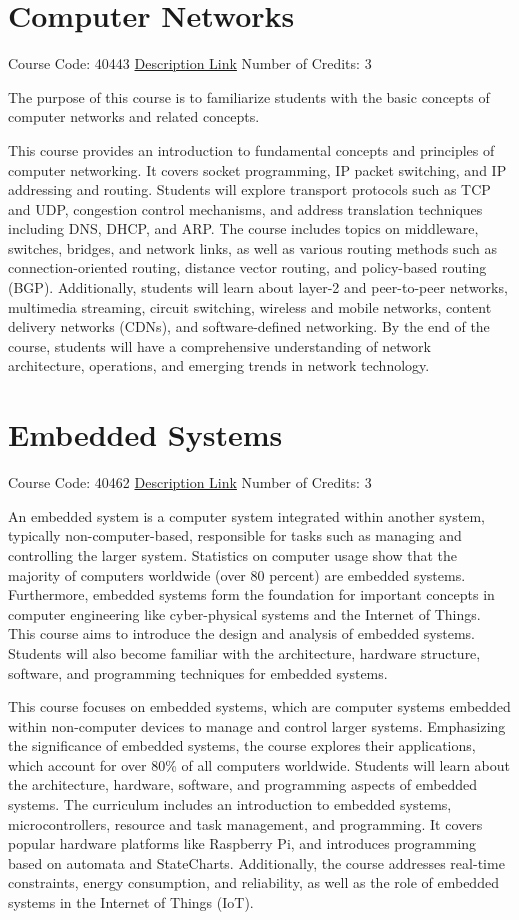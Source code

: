 \documentclass[
fontsize=11pt,
paper=a4,
parskip=half,
enlargefirstpage=off,    %
fromalign=right,        %
fromphone=on,           %
fromemail=on,
fromrule=off,           %
addrfield=off,          %
backaddress=on,         %
subject=beforeopening,  %
locfield=narrow,        %
foldmarks=off,          %
open=any
]{scrartcl}
\begin{document}
\section{Computer Networks}
Course Code: 40443 \qquad \quad \href{https://docs.ce.sharif.edu/course/40443}{Description Link}
\qquad \quad Number of Credits: 3

The purpose of this course is to familiarize students with the basic concepts of computer networks and related concepts.


This course provides an introduction to fundamental concepts and principles of computer networking. It covers socket programming, IP packet switching, and IP addressing and routing. Students will explore transport protocols such as TCP and UDP, congestion control mechanisms, and address translation techniques including DNS, DHCP, and ARP. The course includes topics on middleware, switches, bridges, and network links, as well as various routing methods such as connection-oriented routing, distance vector routing, and policy-based routing (BGP). Additionally, students will learn about layer-2 and peer-to-peer networks, multimedia streaming, circuit switching, wireless and mobile networks, content delivery networks (CDNs), and software-defined networking. By the end of the course, students will have a comprehensive understanding of network architecture, operations, and emerging trends in network technology.

\section{Embedded Systems}
Course Code: 40462 \qquad \quad \href{https://docs.ce.sharif.edu/course/40462}{Description Link}
\qquad \quad Number of Credits: 3

An embedded system is a computer system integrated within another system, typically non-computer-based, responsible for tasks such as managing and controlling the larger system. Statistics on computer usage show that the majority of computers worldwide (over 80 percent) are embedded systems. Furthermore, embedded systems form the foundation for important concepts in computer engineering like cyber-physical systems and the Internet of Things. This course aims to introduce the design and analysis of embedded systems. Students will also become familiar with the architecture, hardware structure, software, and programming techniques for embedded systems.


This course focuses on embedded systems, which are computer systems embedded within non-computer devices to manage and control larger systems. Emphasizing the significance of embedded systems, the course explores their applications, which account for over 80\% of all computers worldwide. Students will learn about the architecture, hardware, software, and programming aspects of embedded systems. The curriculum includes an introduction to embedded systems, microcontrollers, resource and task management, and programming. It covers popular hardware platforms like Raspberry Pi, and introduces programming based on automata and StateCharts. Additionally, the course addresses real-time constraints, energy consumption, and reliability, as well as the role of embedded systems in the Internet of Things (IoT).
\end{document}

